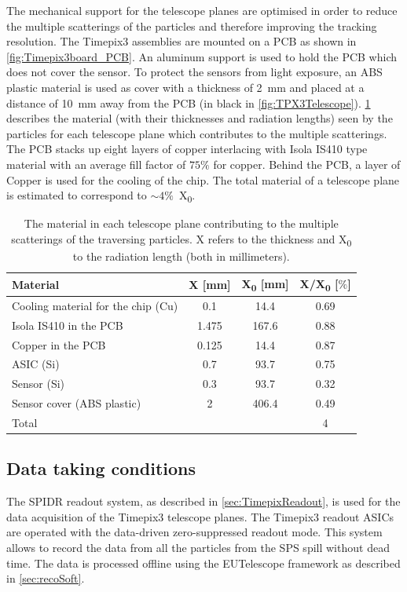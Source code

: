 The mechanical support for the telescope planes are optimised in order
to reduce the multiple scatterings of the particles and therefore
improving the tracking resolution. The Timepix3 assemblies are mounted
on a PCB as shown in \cref{fig:Timepix3board_PCB}. An aluminum support
is used to hold the PCB which does not cover the sensor. To protect
the sensors from light exposure, an ABS plastic material is used as
cover with a thickness of 2~mm and placed at a distance of 10~mm away
from the PCB (in black in
\cref{fig:TPX3Telescope}). \cref{tab:TPX3TelescopeMaterial} describes
the material (with their thicknesses and radiation lengths) seen by
the particles for each telescope plane which contributes to the
multiple scatterings. The PCB stacks up eight layers of copper
interlacing with Isola IS410 type material with an average fill factor
of $75\%$ for copper. Behind the PCB, a layer of Copper is used for
the cooling of the chip. The total material of a telescope plane is
estimated to correspond to $\sim4\%$~X\textsubscript{0}.

\begin{table}[htbp]
  \centering
  \caption{The material in each telescope plane contributing to the
    multiple scatterings of the traversing particles. X refers to the thickness and X\textsubscript{0} to the radiation
    length (both in millimeters).}
  \label{tab:TPX3TelescopeMaterial}
  \begin{tabular}{l c c c}
    \toprule
    Material & X [mm] & X\textsubscript{0} [mm] & X/X\textsubscript{0} [$\%$] \\
    \midrule
    Cooling material for the chip (Cu) & 0.1 & 14.4 & 0.69 \\
    Isola IS410 in the PCB & 1.475 & 167.6 & 0.88 \\
    Copper in the PCB & 0.125 & 14.4 & 0.87 \\
    ASIC (Si) & 0.7 & 93.7 & 0.75\\
    Sensor (Si) & 0.3 & 93.7 & 0.32\\ 
    Sensor cover (ABS plastic) & 2 & 406.4 & 0.49 \\ \hline
    Total & & & 4 \\
    \bottomrule
  \end{tabular}
\end{table}

\subsection{Data taking conditions}
The SPIDR readout system, as described in \cref{sec:TimepixReadout},
is used for the data acquisition of the Timepix3 telescope planes. The
Timepix3 readout ASICs are operated with the data-driven
zero-suppressed readout mode. This system allows to record the data
from all the particles from the SPS spill without dead time. The data
is processed offline using the EUTelescope framework as described in
\cref{sec:recoSoft}.



